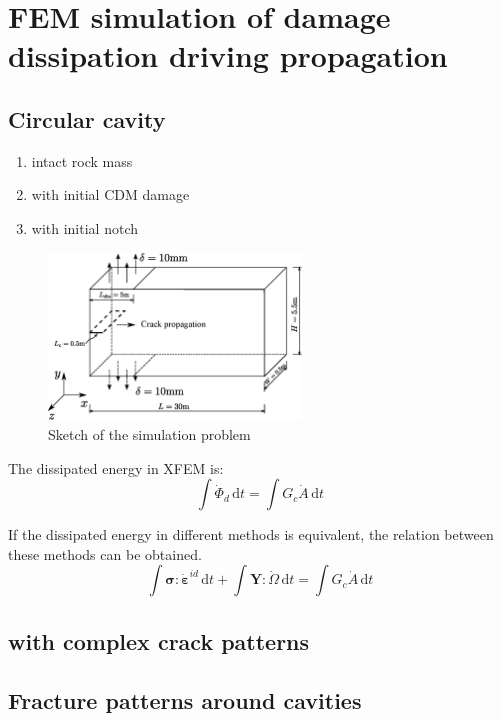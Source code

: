 \documentclass[preprint,review,12pt]{elsarticle}
\newcommand{\ud}{\textrm{d}}
\begin{document}
\section{FEM simulation of damage dissipation driving propagation}
\subsection{Circular cavity}
\begin{enumerate}
\item intact rock mass
\item with initial CDM damage
\item with initial notch
\end{enumerate}

\begin{figure}[htbp]
   \centering
  \includegraphics[width=0.6\textwidth]{inkscape/sketch/sketch.eps}
   \caption{Sketch of the simulation problem}
   \label{fig:sketch}
\end{figure}

The dissipated energy in XFEM is:
%
\begin{equation}
\label{eq:diss_XFEM}
    \int \dot\varPhi_{d} \, \ud t = \int G_c\dot{A} \,\ud{t}
\end{equation}

If the dissipated energy in different methods is equivalent, the relation between these methods can be obtained.
\begin{equation}
\label{eq:diss_XFEM}
    \int \bm\sigma:\dot{\bm\varepsilon}^{id}\,\ud{t}+\int\bm{Y}:\dot{\bm\varOmega}\,\ud{t} =
    \int G_c\dot{A} \,\ud{t}
\end{equation}
\subsection{with complex crack patterns}

% 
\subsection{Fracture patterns around cavities}
\end{document}
